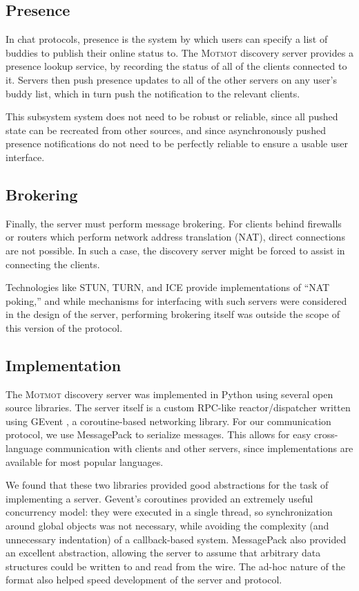 \documentclass{sig-alternate}
\newcommand\Motmot{\textsc{Motmot}\xspace}
\begin{document}
\subsection{Presence}

In chat protocols, presence is the system by which users can specify a list of
buddies to publish their online status to. The \Motmot discovery server provides
a presence lookup service, by recording the status of all of the clients
connected to it. Servers then push presence updates to all of the other servers
on any user's buddy list, which in turn push the notification to the relevant
clients.

This subsystem system does not need to be robust or reliable, since all pushed
state can be recreated from other sources, and since asynchronously pushed
presence notifications do not need to be perfectly reliable to ensure a usable
user interface.

\subsection{Brokering}

Finally, the server must perform message brokering. For clients behind firewalls
or routers which perform network address translation (NAT), direct connections
are not possible. In such a case, the discovery server might be forced to assist
in connecting the clients.

Technologies like STUN, TURN, and ICE provide implementations of ``NAT poking,''
and while mechanisms for interfacing with such servers were considered in the
design of the server, performing brokering itself was outside the scope of this
version of the protocol.

\subsection{Implementation}

The \Motmot discovery server was implemented in Python using several open source
libraries. The server itself is a custom RPC-like reactor/dispatcher written
using GEvent \cite{glib}, a coroutine-based networking library. For our
communication protocol, we use MessagePack \cite{msgpack} to serialize messages.
This allows for easy cross-language communication with clients and other servers,
since implementations are available for most popular languages.

We found that these two libraries provided good abstractions for the task of
implementing a server. Gevent's coroutines provided an extremely useful
concurrency model: they were executed in a single thread, so synchronization
around global objects was not necessary, while avoiding the complexity (and
unnecessary indentation) of a callback-based system. MessagePack also provided an
excellent abstraction, allowing the server to assume that arbitrary data
structures could be written to and read from the wire. The ad-hoc nature of the
format also helped speed development of the server and protocol.
\end{document}

